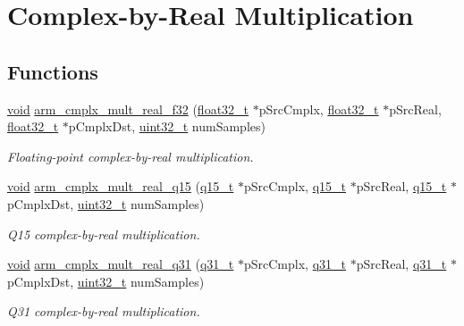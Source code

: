 \hypertarget{group___cmplx_by_real_mult}{\section{Complex-\/by-\/\-Real Multiplication}
\label{group___cmplx_by_real_mult}
}
\subsection*{Functions}
\begin{DoxyCompactItemize}
\item 
\hyperlink{group___n_a_m_e_ga18028b8badbf1ea7e704ccac3c488e82}{void} \hyperlink{group___cmplx_by_real_mult_ga9c18616f56cb4d3c0889ce0b339221ca}{arm\-\_\-cmplx\-\_\-mult\-\_\-real\-\_\-f32} (\hyperlink{arm__math_8h_a4611b605e45ab401f02cab15c5e38715}{float32\-\_\-t} $\ast$p\-Src\-Cmplx, \hyperlink{arm__math_8h_a4611b605e45ab401f02cab15c5e38715}{float32\-\_\-t} $\ast$p\-Src\-Real, \hyperlink{arm__math_8h_a4611b605e45ab401f02cab15c5e38715}{float32\-\_\-t} $\ast$p\-Cmplx\-Dst, \hyperlink{stdint_8h_a435d1572bf3f880d55459d9805097f62}{uint32\-\_\-t} num\-Samples)
\begin{DoxyCompactList}\small\item\em Floating-\/point complex-\/by-\/real multiplication. \end{DoxyCompactList}\item 
\hyperlink{group___n_a_m_e_ga18028b8badbf1ea7e704ccac3c488e82}{void} \hyperlink{group___cmplx_by_real_mult_ga3bd8889dcb45980e1d3e53344df54e85}{arm\-\_\-cmplx\-\_\-mult\-\_\-real\-\_\-q15} (\hyperlink{arm__math_8h_ab5a8fb21a5b3b983d5f54f31614052ea}{q15\-\_\-t} $\ast$p\-Src\-Cmplx, \hyperlink{arm__math_8h_ab5a8fb21a5b3b983d5f54f31614052ea}{q15\-\_\-t} $\ast$p\-Src\-Real, \hyperlink{arm__math_8h_ab5a8fb21a5b3b983d5f54f31614052ea}{q15\-\_\-t} $\ast$p\-Cmplx\-Dst, \hyperlink{stdint_8h_a435d1572bf3f880d55459d9805097f62}{uint32\-\_\-t} num\-Samples)
\begin{DoxyCompactList}\small\item\em Q15 complex-\/by-\/real multiplication. \end{DoxyCompactList}\item 
\hyperlink{group___n_a_m_e_ga18028b8badbf1ea7e704ccac3c488e82}{void} \hyperlink{group___cmplx_by_real_mult_ga715e4bb8e945b8ca51ec5237611697ce}{arm\-\_\-cmplx\-\_\-mult\-\_\-real\-\_\-q31} (\hyperlink{arm__math_8h_adc89a3547f5324b7b3b95adec3806bc0}{q31\-\_\-t} $\ast$p\-Src\-Cmplx, \hyperlink{arm__math_8h_adc89a3547f5324b7b3b95adec3806bc0}{q31\-\_\-t} $\ast$p\-Src\-Real, \hyperlink{arm__math_8h_adc89a3547f5324b7b3b95adec3806bc0}{q31\-\_\-t} $\ast$p\-Cmplx\-Dst, \hyperlink{stdint_8h_a435d1572bf3f880d55459d9805097f62}{uint32\-\_\-t} num\-Samples)
\begin{DoxyCompactList}\small\item\em Q31 complex-\/by-\/real multiplication. \end{DoxyCompactList}\end{DoxyCompactItemize}


